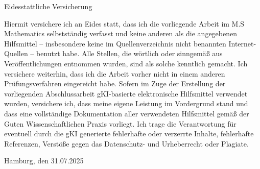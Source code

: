 \documentclass[10pt,a4paper,oneside]{book}
\begin{document}
	
	\tableofcontents
	\newpage
    \setlength{\parindent}{0em} 
    
	\newpage
	
    \newpage
    
    \newpage
	
	\newpage
	
	\newpage
	


        

	\printbibliography
	
	\newpage
	\thispagestyle{plain}

	\begin{center}
		Eidesstattliche Versicherung
	\end{center}

	Hiermit versichere ich an Eides statt, dass ich die vorliegende Arbeit im
	M.S Mathematics selbstständig verfasst und keine anderen als die angegebenen
	Hilfsmittel – insbesondere keine im Quellenverzeichnis nicht benannten
	Internet-Quellen – benutzt habe. Alle Stellen, die wörtlich oder sinngemäß
	aus Veröffentlichungen entnommen wurden, sind als solche kenntlich gemacht.
	Ich versichere weiterhin, dass ich die Arbeit vorher nicht in einem anderen
	Prüfungsverfahren eingereicht habe.  
	Sofern im Zuge der Erstellung der vorliegenden Abschlussarbeit gKI-basierte
	elektronische Hilfsmittel verwendet wurden, versichere ich, dass meine eigene
	Leistung im Vordergrund stand und dass eine vollständige Dokumentation aller
	verwendeten Hilfsmittel gemäß der Guten Wissenschaftlichen Praxis vorliegt. Ich
	trage die Verantwortung für eventuell durch die gKI generierte fehlerhafte oder
	verzerrte Inhalte, fehlerhafte Referenzen, Verstöße gegen das Datenschutz- und
	Urheberrecht oder Plagiate.

	\medskip
	
	Hamburg, den 31.07.2025
\end{document}
